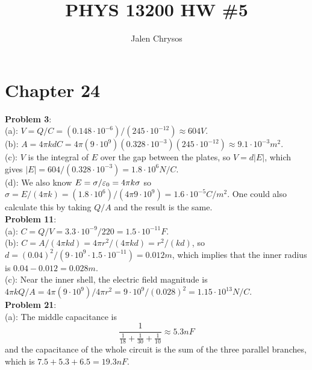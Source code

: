 \documentclass{amsart}
\title{PHYS 13200 HW \#5}
\author{Jalen Chrysos}
\begin{document}
	
	\maketitle
	
	\section*{Chapter 24}
	
	\textbf{Problem 3}:\\
	
	(a): $V = Q/C = (0.148 \cdot 10^{-6})/(245 \cdot 10^{-12}) \approx 604 V$.\\
	
	(b): $A = 4\pi k d C = 4\pi (9\cdot 10^9) (0.328 \cdot 10^{-3})(245 \cdot 10^{-12}) \approx 9.1 \cdot 10^{-3} m^2$.\\
	
	(c): $V$ is the integral of $E$ over the gap between the plates, so $V=d|E|$, which gives $|E| = 604 / (0.328 \cdot 10^{-3}) = 1.8 \cdot 10^6 N/C$.\\
	
	(d): We also know $E=\sigma / \varepsilon_0 = 4\pi k \sigma$ so $\sigma = E/(4\pi k) = (1.8 \cdot 10^{6})/(4\pi 9\cdot 10^{9}) = 1.6 \cdot 10^{-5} C/m^2$. One could also calculate this by taking $Q/A$ and the result is the same.\\
	
	\textbf{Problem 11}:\\
	
	(a): $C = Q/V = 3.3 \cdot 10^{-9}/220 = 1.5 \cdot 10^{-11} F$.\\
	
	(b): $C = A/(4\pi k d) = 4\pi r^2/(4\pi k d)= r^2/(kd)$, so $d = (0.04)^2/(9\cdot 10^9\cdot 1.5 \cdot 10^{-11}) = 0.012 m$, which implies that the inner radius is $0.04 - 0.012 = 0.028 m$.\\
	
	(c): Near the inner shell, the electric field magnitude is $4\pi k Q/A = 4\pi (9\cdot 10^9) / 4\pi r^2 = 9\cdot 10^9/(0.028)^2 = 1.15 \cdot 10^13 N/C$.\\
	
	\textbf{Problem 21}:\\
	
	(a): The middle capacitance is 
	$$
	\frac{1}{\frac{1}{18} + \frac{1}{30} + \frac{1}{10}} \approx 5.3 nF
	$$
	and the capacitance of the whole circuit is the sum of the three parallel branches, which is $7.5 + 5.3 + 6.5 = 19.3 nF$.\\
	
\end{document}
